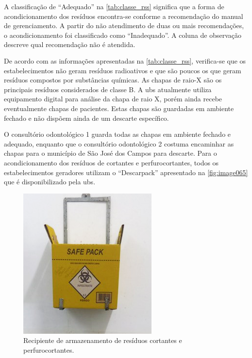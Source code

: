 	A classificação de “Adequado” na \autoref{tab:classe_rss} significa que a forma de acondicionamento dos resíduos encontra-se conforme a recomendação do manual de gerenciamento. A partir do não atendimento de duas ou mais recomendações, o acondicionamento foi classificado como “Inadequado”. A coluna de observação descreve qual recomendação não é atendida.
	
	
	
	De acordo com as informações apresentadas na \autoref{tab:classe_rss}, verifica-se que os estabelecimentos não geram resíduos radioativos e que são poucos os que geram resíduos compostos por substâncias químicas. As chapas de raio-X são os principais resíduos considerados de classe B. A \gls{ubs} atualmente utiliza equipamento digital para análise da chapa de raio X, porém ainda recebe eventualmente chapas de pacientes. Estas chapas são guardadas em ambiente fechado e não dispõem ainda de um descarte específico.
	
	O consultório odontológico 1 guarda todas as chapas em ambiente fechado e adequado, enquanto que o consultório odontológico 2 costuma encaminhar as chapas para o município de São José dos Campos para descarte.
	Para o acondicionamento dos resíduos de cortantes e perfurocortantes, todos os estabelecimentos geradores utilizam o “Descarpack” apresentado na \autoref{fig:image065} que é disponibilizado pela \gls{ubs}.
	
	\begin{figure}
		\centering
		\includegraphics[width=0.75\linewidth]{produtos/prodtres/image065}
		\caption{Recipiente de armazenamento de resíduos cortantes e perfurocortantes.}
		\label{fig:image065}
	\end{figure}
	
